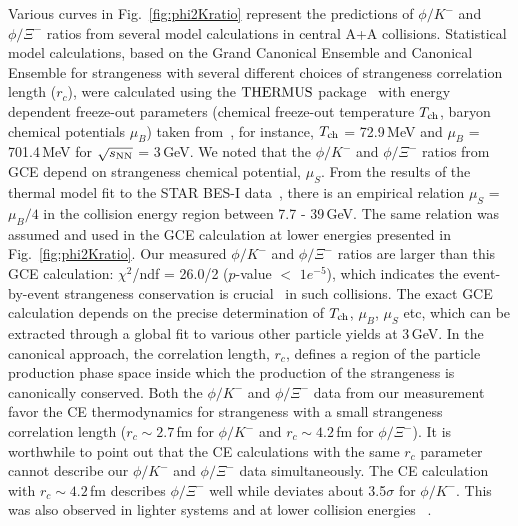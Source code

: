\documentclass[aps,tightenlines,superscriptaddress,twocolumn]{revtex4-1}
\begin{document}
Various curves in Fig.~\ref{fig:phi2Kratio} represent the predictions of $\phi/K^-$ and $\phi/\Xi^-$ ratios from several model calculations in central A+A collisions. Statistical model calculations, based on the Grand Canonical Ensemble and Canonical Ensemble for strangeness with several different choices of strangeness correlation length ($r_c$), were calculated using the $\textup{THERMUS}$ package~\cite{THERMUS_WHEATON200984} with energy dependent freeze-out parameters (chemical freeze-out temperature $T_{\rm ch}$, baryon chemical potentials $\mu_B$) taken from~\cite{Andronic_2018Naure}, for instance, $T_{\rm ch}$ = 72.9\,MeV and $\mu_B$ = 701.4\,MeV for $\sqrt{s_{\rm NN}}$ = 3\,GeV.
We noted that the $\phi/K^-$ and $\phi/\Xi^-$ ratios from GCE depend on strangeness chemical potential, $\mu_{S}$.
From the results of the thermal model fit to the STAR BES-I data~\cite{star_bes_strangeness:2020}, there is an empirical relation $\mu_{S}$ = $\mu_{B}/4$ in the collision energy region between 7.7 - 39\,GeV. The same relation was assumed and used in the GCE calculation at lower energies presented in Fig.~\ref{fig:phi2Kratio}. 
Our measured $\phi/K^-$ and $\phi/\Xi^-$ ratios are larger than this GCE calculation: $\chi^2$/ndf = 26.0/2 ($p$-value $<$ $1e^{-5}$), 
which indicates the event-by-event strangeness conservation 
is crucial~\cite{BraunMunzinger:2003zd} in such collisions.
The exact GCE calculation depends on the precise determination of $T_{\rm ch}$, $\mu_B$, $\mu_S$ etc, which can be extracted through a global fit to various other particle yields at 3\,GeV.
In the canonical approach, the correlation length, $r_c$, defines a region of the particle production phase space inside which the production of the strangeness is canonically conserved. Both the $\phi/K^-$ and $\phi/\Xi^-$ data from our measurement favor the CE thermodynamics for strangeness with a small strangeness correlation length ($r_c \sim 2.7$\,fm for $\phi/K^-$ and $r_c \sim 4.2$\,fm for $\phi/\Xi^-$). It is worthwhile to point out that the CE calculations with the same $r_c$ parameter cannot describe our $\phi/K^-$ and $\phi/\Xi^-$ data simultaneously. The CE calculation with $r_c \sim 4.2$\,fm describes $\phi/\Xi^-$ well while deviates about 3.5$\sigma$ for $\phi/K^-$. This was also observed in lighter systems and at lower collision energies ~\cite{HADES_phi_ArKCl:2009,Xi_ArKCl_HADES:2009}.
\end{document}
